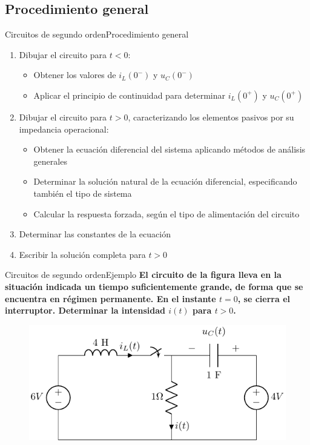 \documentclass[aspectratio=169, xcolor={usenames,svgnames,dvipsnames}]{beamer}
\begin{document}
\subsection{Procedimiento general}
\begin{frame}{Circuitos de segundo orden}{Procedimiento general}
    \begin{enumerate}
	\item Dibujar el circuito para $t < 0$:
        \begin{itemize}
        \item Obtener los valores de $i_L(0^-)$ y $u_C(0^-)$
        \item Aplicar el principio de continuidad para determinar $i_L(0^+)$ y $u_C(0^+)$
        \end{itemize}
    \item Dibujar el circuito para \(t > 0\), caracterizando los elementos pasivos por su impedancia operacional:
        \begin{itemize}
        \item Obtener la ecuación diferencial del sistema aplicando métodos de análisis generales 
        \item Determinar la solución natural de la ecuación diferencial, especificando también el tipo de sistema 
        \item Calcular la respuesta forzada, según el tipo de alimentación del circuito
        \end{itemize}
        \item Determinar las constantes de la ecuación 
    \item Escribir la solución completa para $t>0$
    \end{enumerate}
\end{frame}

\begin{frame}{Circuitos de segundo orden}{Ejemplo}
    \textbf{El circuito de la figura lleva en la situación indicada un tiempo suficientemente grande, de forma que se encuentra en régimen permanente. En el instante $t=0$, se cierra el interruptor. Determinar la intensidad $i(t)$ para $t>0$. }
	    \begin{figure}[H]
	        \centering
	        \includegraphics{../figs/ejemplo_2orden.pdf}
	    \end{figure}
\end{frame}
\end{document}

